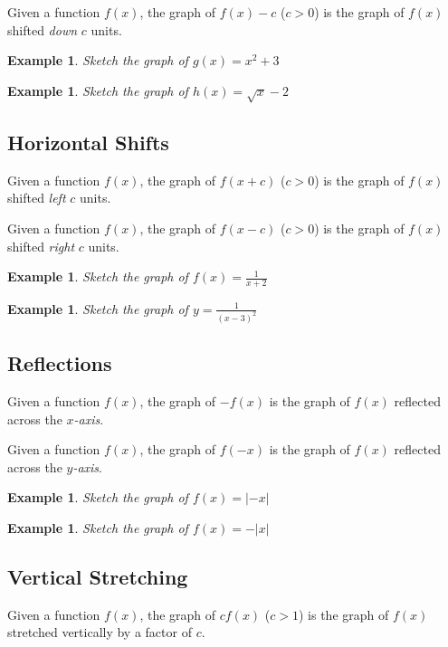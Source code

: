 \documentclass[twoside]{tufte-handout}
\newcounter{ekcounter}%
\theoremstyle{ekimcustom}
\newtheorem{exm}[ekcounter]{Example}
\begin{document}
Given a function $f(x)$, the graph of $f(x)-c$ ($c>0$) is the graph of $f(x)$ shifted {\it down} $c$ units.

\everymath{\displaystyle}
\begin{exm}{Sketch the graph of $g(x)=x^2+3$}
\end{exm}\vskip10pt

\begin{exm}{Sketch the graph of $h(x)=\sqrt{x}-2$}
\end{exm}\vskip10pt



\subsection{Horizontal Shifts}
Given a function $f(x)$, the graph of $f(x+c)$ ($c>0$) is the graph of $f(x)$ shifted {\it left} $c$ units.

Given a function $f(x)$, the graph of $f(x-c)$ ($c>0$) is the graph of $f(x)$ shifted {\it right} $c$ units.

\begin{exm}{Sketch the graph of $f(x)=\frac{1}{x+2}$}
\end{exm}\vskip10pt

\begin{exm}{Sketch the graph of $y=\frac{1}{(x-3)^2}$}
\end{exm}\vskip10pt



\subsection{Reflections}
Given a function $f(x)$, the graph of $-f(x)$ is the graph of $f(x)$ reflected across the {\it $x$-axis}.

Given a function $f(x)$, the graph of $f(-x)$ is the graph of $f(x)$ reflected across the {\it $y$-axis}.

\begin{exm}{Sketch the graph of $f(x)=|-x|$}
\end{exm}\vskip10pt

\begin{exm}{Sketch the graph of $f(x)=-|x|$}
\end{exm}\vskip10pt



\subsection{Vertical Stretching}
Given a function $f(x)$, the graph of $cf(x)$ ($c>1$) is the graph of $f(x)$ stretched vertically by a factor of $c$.
\end{document}
